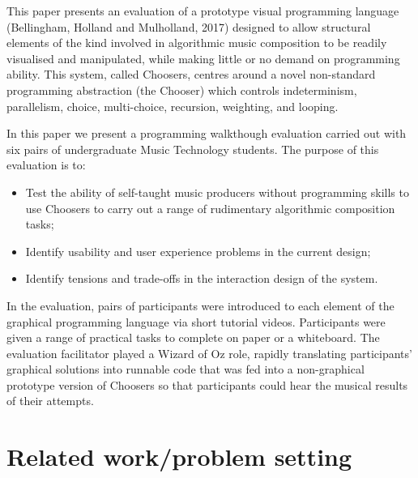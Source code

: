 \documentclass{ppig}
\begin{document}
This paper presents an evaluation of a prototype visual programming
language (Bellingham, Holland and Mulholland, 2017) designed to allow
structural elements of the kind involved in algorithmic music
composition to be readily visualised and manipulated, while making
little or no demand on programming ability. This system, called
Choosers, centres around a novel non-standard programming abstraction
(the Chooser) which controls indeterminism, parallelism, choice,
multi-choice, recursion, weighting, and looping.

In this paper we present a programming walkthough evaluation carried out
with six pairs of undergraduate Music Technology students. The purpose
of this evaluation is to:

\begin{itemize}
\item
  Test the ability of self-taught music producers without programming
  skills to use Choosers to carry out a range of rudimentary algorithmic
  composition tasks;
\item
  Identify usability and user experience problems in the current design;
\item
  Identify tensions and trade-offs in the interaction design of the
  system.
\end{itemize}

In the evaluation, pairs of participants were introduced to each element
of the graphical programming language via short tutorial videos.
Participants were given a range of practical tasks to complete on paper
or a whiteboard. The evaluation facilitator played a Wizard of Oz role,
rapidly translating participants' graphical solutions into runnable code
that was fed into a non-graphical prototype version of Choosers so that
participants could hear the musical results of their attempts.

\hypertarget{related-workproblem-setting}{%
\section{Related work/problem
setting}\label{related-workproblem-setting}}
\end{document}
